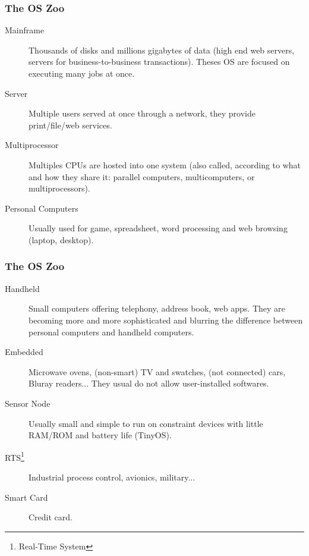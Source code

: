   \begin{frame}
    \frametitle{The OS Zoo}
        \begin{block}{}
          \begin{description}
            \item[Mainframe] Thousands of disks and millions gigabytes of data (high end web servers, servers for business-to-business transactions). Theses OS are focused on executing many jobs at once.
            \item[Server] Multiple users served at once through a network, they provide print/file/web services.
            \item[Multiprocessor] Multiples CPUs are hosted into one system (also called, according to what and how they share it: parallel computers, multicomputers, or multiprocessors).
            \item[Personal Computers] Usually used for game, spreadsheet, word processing and web browsing (laptop, desktop).
          \end{description}
        \end{block}
  \end{frame}
  \begin{frame}
    \frametitle{The OS Zoo}
        \begin{block}{}
          \begin{description}
            \item[Handheld] Small computers offering telephony, address book, web apps. They are becoming more and more sophisticated and blurring the difference between personal computers and handheld computers.
            \item[Embedded] Microwave ovens, (non-smart) TV and swatches, (not connected) cars, Bluray readers... They usual do not allow user-installed softwares.
            \item[Sensor Node] Usually small and simple to run on constraint devices with little RAM/ROM and battery life (TinyOS).
            \item[RTS\footnote{Real-Time System}] Industrial process control, avionics, military...
            \item[Smart Card] Credit card.
          \end{description}
        \end{block}
  \end{frame}
